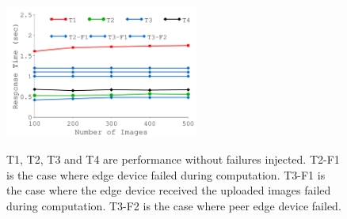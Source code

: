 {
\begin{figure}[th]
\begin{center}
	\centerline{\includegraphics[width=2.5in]{Figures/g_plot_app.pdf}}
	{
		T1, T2, T3 and T4 are performance without failures injected. T2-F1 is the case where
		edge device failed during computation. T3-F1 is the case where the edge
		device received the uploaded images failed during computation. T3-F2 is
		the case where peer edge device failed. 
	}
\end{center}
\end{figure}
}

